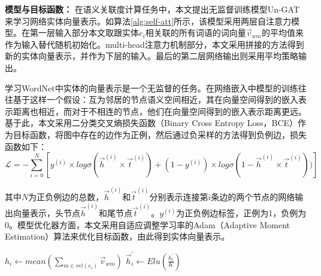 \textbf{模型与目标函数：}
在语义关联度计算任务中，本文提出无监督训练模型Un-GAT来学习网络实体向量表示。如算法\ref{alg:self-att}所示，该模型采用两层自注意力模型。在第一层输入部分本文取跟实体$e_i$相关联的所有词语的词向量$\vec v_{wm}$的平均值来作为输入替代随机初始化。multi-head注意力机制部分，本文采用拼接的方法得到新的实体向量表示，并作为下层的输入。最后的第二层网络输出则采用平均策略输出。

学习WordNet中实体的向量表示是一个无监督的任务。在网络嵌入中模型的训练往往基于这样一个假设：互为邻居的节点语义空间相近，其在向量空间得到的嵌入表示距离也相近，而对于不相连的节点，他们在向量空间得到的嵌入表示距离更远。基于此，本文采用二分类交叉熵损失函数（Binary Cross Entropy Loss，BCE）作为目标函数，将图中存在的边作为正例，然后通过负采样的方法得到负例边，损失函数如下：
\begin{equation}
    \mathcal{L} = -\sum_{i = 0}^{N} [y^{(i)} \times log\sigma(\vec h^{(i)} \times \vec t^{(i)})+(1 - y_{}^{(i)})\times log\sigma(1 - \vec h^{(i)} \times \vec t^{(i)}))]
    \label{wordnet_loss}
\end{equation}

\noindent 其中$N$为正负例边的总数，$\vec h^{(i)}$和$\vec t^{(i)}$分别表示连接第$i$条边的两个节点的网络输出向量表示，头节点$\vec h^{(i)}$和尾节点$\vec t^{(i)}$。$y^{(i)}$为正负例边标签，正例为1，负例为0。模型优化器方面，本文采用自适应调整学习率的Adam（Adaptive Moment Estimation）算法来优化目标函数，由此得到实体向量表示。

\begin{algorithm}
    \label{alg:self-att}
    $h_i \leftarrow mean(\sum_{m \in rel(e_i)} \vec v_{wm})$ \;
    $\vec h_i^{'} \leftarrow Elu(\frac{h_i^{'}}{K})$
\end{algorithm}

